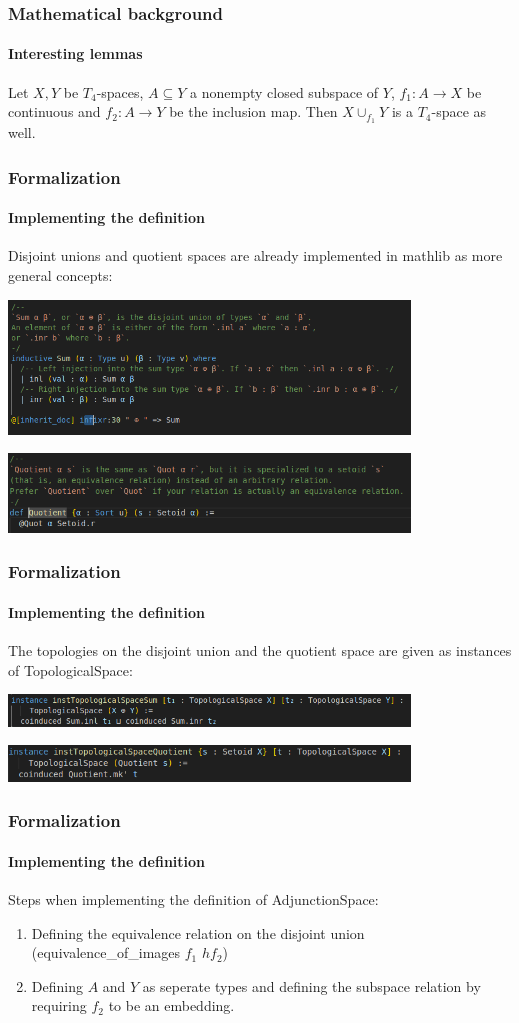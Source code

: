 \documentclass{beamer}
\begin{document}
	\begin{frame}
		\frametitle{Mathematical background}
		\framesubtitle{Interesting lemmas}
		\begin{lemma}
			Let $X, Y$ be $T_4$-spaces, $A \subseteq Y$ a nonempty closed subspace of $Y$, $f_1 : A \to X$ be continuous and $f_2 : A \to Y$ be the inclusion map. Then $X \cup_{f_1} Y$ is a $T_4$-space as well.
		\end{lemma}
	\end{frame}
	\begin{frame}
		\frametitle{Formalization}
		\framesubtitle{Implementing the definition}
		Disjoint unions and quotient spaces are already implemented in mathlib as more general concepts:
		
		\includegraphics[width = 0.8\textwidth]{Disjoint_union.png}
		
		\includegraphics[width = 0.8\textwidth]{Quotient.png}
	\end{frame}
	\begin{frame}
		\frametitle{Formalization}
		\framesubtitle{Implementing the definition}
		The topologies on the disjoint union and the quotient space are given as instances of TopologicalSpace:
		
		\includegraphics[width = 0.8\textwidth]{Disjoint_union_topology.png}
		
		\includegraphics[width = 0.8\textwidth]{Quotienttopology.png}
	\end{frame}
	\begin{frame}
		\frametitle{Formalization}
		\framesubtitle{Implementing the definition}
		Steps when implementing the definition of AdjunctionSpace:
		\begin{enumerate}
			\item Defining the equivalence relation on the disjoint union (equivalence\_of\_images $f_1$ $hf_2$)
			\item Defining $A$ and $Y$ as seperate types and defining the subspace relation by requiring $f_2$ to be an embedding.
		\end{enumerate}
	\end{frame}
\end{document}
